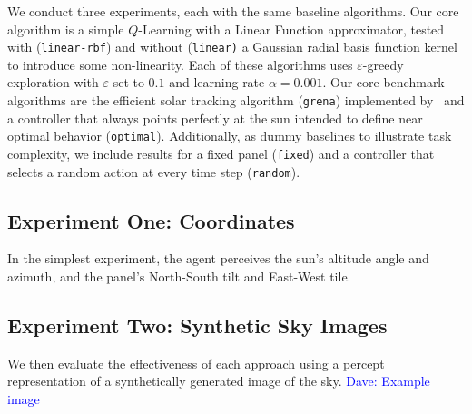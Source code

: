 \documentclass[11pt]{article}
\newcommand{\dnote}[1]{\textcolor{blue}{Dave: #1}}
\newcommand{\mc}{\mathcal}
\begin{document}
We conduct three experiments, each with the same baseline algorithms. Our core algorithm is a simple $Q$-Learning with a Linear Function approximator, tested with (\texttt{linear-rbf}) and without (\texttt{linear)} a Gaussian radial basis function kernel to introduce some non-linearity. Each of these algorithms uses $\varepsilon$-greedy exploration with $\varepsilon$ set to $0.1$ and learning rate $\alpha = 0.001$. Our core benchmark algorithms are the efficient solar tracking algorithm (\texttt{grena}) implemented by~\citet{Grena2008} and a controller that always points perfectly at the sun intended to define near optimal behavior (\texttt{optimal}). Additionally, as dummy baselines to illustrate task complexity, we include results for a fixed panel (\texttt{fixed}) and a controller that selects a random action at every time step (\texttt{random}).



\subsection{Experiment One: Coordinates}

In the simplest experiment, the agent perceives the sun's altitude angle and azimuth, and the panel's North-South tilt and East-West tile.

\subsection{Experiment Two: Synthetic Sky Images}

We then evaluate the effectiveness of each approach using a percept representation of a synthetically generated image of the sky.
\dnote{Example image}
\end{document}
